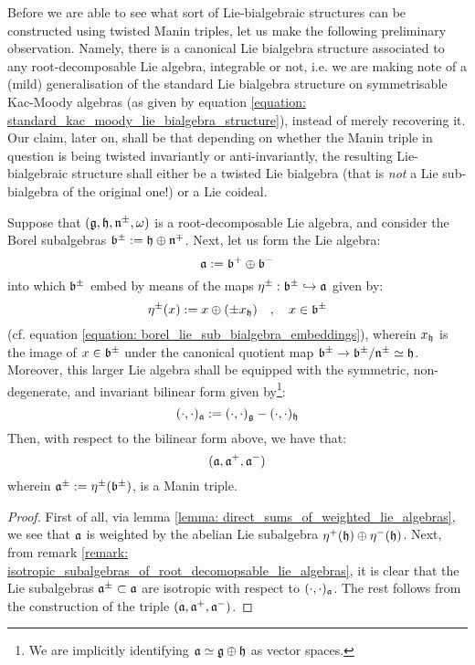         Before we are able to see what sort of Lie-bialgebraic structures can be constructed using twisted Manin triples, let us make the following preliminary observation. Namely, there is a canonical Lie bialgebra structure associated to any root-decomposable Lie algebra, integrable or not, i.e. we are making note of a (mild) generalisation of the standard Lie bialgebra structure on symmetrisable Kac-Moody algebras (as given by equation \eqref{equation: standard_kac_moody_lie_bialgebra_structure}), instead of merely recovering it. Our claim, later on, shall be that depending on whether the Manin triple in question is being twisted invariantly or anti-invariantly, the resulting Lie-bialgebraic structure shall either be a twisted Lie bialgebra (that is \textit{not} a Lie sub-bialgebra of the original one!) or a Lie coideal.
        \begin{lemma} \label{lemma: root_decomposable_lie_bialgebras}
            Suppose that $(\mathfrak{g}, \mathfrak{h}, \mathfrak{n}^{\pm}, \omega)$ is a root-decomposable Lie algebra, and consider the Borel subalgebras $\mathfrak{b}^{\pm} := \mathfrak{h} \oplus \mathfrak{n}^{\mp}$. Next, let us form the Lie algebra:
                $$\mathfrak{a} := \mathfrak{b}^+ \oplus \mathfrak{b}^-$$
            into which $\mathfrak{b}^{\pm}$ embed by means of the maps $\eta^{\pm}: \mathfrak{b}^{\pm} \hookrightarrow \mathfrak{a}$ given by:
                \begin{equation} \label{equation: root_decomposable_borel_subalgebra_embeddings}
                    \eta^{\pm}(x) := x \oplus ( \pm x_{\mathfrak{h}} ) \quad, \quad x \in \mathfrak{b}^{\pm}
                \end{equation}
            (cf. equation \eqref{equation: borel_lie_sub_bialgebra_embeddings}), wherein $x_{\mathfrak{h}}$ is the image of $x \in \mathfrak{b}^{\pm}$ under the canonical quotient map $\mathfrak{b}^{\pm} \to \mathfrak{b}^{\pm}/\mathfrak{n}^{\pm} \simeq \mathfrak{h}$. Moreover, this larger Lie algebra shall be equipped with the symmetric, non-degenerate, and invariant bilinear form given by\footnote{We are implicitly identifying $\mathfrak{a} \simeq \mathfrak{g} \oplus \mathfrak{h}$ as vector spaces.}:
                \begin{equation} \label{equation: extended_root_decomposable_pairings}
                    (\cdot, \cdot)_{\mathfrak{a}} := (\cdot, \cdot)_{\mathfrak{g}} - (\cdot, \cdot)_{\mathfrak{h}}
                \end{equation}
            Then, with respect to the bilinear form above, we have that:
                \begin{equation} \label{equation: root_decomposable_manin_triples}
                    (\mathfrak{a}, \mathfrak{a}^+, \mathfrak{a}^-)
                \end{equation}
            wherein $\mathfrak{a}^{\pm} := \eta^{\pm}(\mathfrak{b}^{\pm})$, is a Manin triple.
        \end{lemma}
            \begin{proof}
                First of all, via lemma \ref{lemma: direct_sums_of_weighted_lie_algebras}, we see that $\mathfrak{a}$ is weighted by the abelian Lie subalgebra $\eta^+(\mathfrak{h}) \oplus \eta^-(\mathfrak{h})$. Next, from remark \ref{remark: isotropic_subalgebras_of_root_decomopsable_lie_algebras}, it is clear that the Lie subalgebras $\mathfrak{a}^{\pm} \subset \mathfrak{a}$ are isotropic with respect to $(\cdot, \cdot)_{\mathfrak{a}}$. The rest follows from the construction of the triple $(\mathfrak{a}, \mathfrak{a}^+, \mathfrak{a}^-)$.
            \end{proof}

